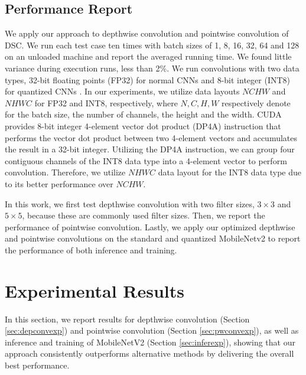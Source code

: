 \subsection{Performance Report}
We apply our approach to depthwise convolution and pointwise convolution of DSC.  We run each test case ten times with batch sizes of 1, 8,
16, 32, 64 and 128 on an unloaded machine and report the averaged running time. We found little variance during execution runs, less than
2\%. We run convolutions with two data types, 32-bit floating points (FP32) for normal CNNs and 8-bit integer (INT8) for quantized CNNs
\cite{nagel2019data}. In our experiments, we utilize data layouts $NCHW$ and $NHWC$ for FP32 and INT8, respectively, where $N, C, H, W$
respectively denote for the batch size, the number of channels, the height and the width. CUDA \cite{cudatoolkit} provides 8-bit integer
4-element vector dot product (DP4A) instruction that performs the vector dot product between two 4-element vectors and accumulates the
result in a 32-bit integer. Utilizing the DP4A instruction, we can group four contiguous channels of the INT8 data type into a 4-element
vector to perform convolution. Therefore, we utilize $NHWC$ data layout for the INT8 data type due to its better performance over $NCHW$.

In this work, we first test depthwise convolution with two filter sizes, $3 \times 3$ and $5 \times 5$, because these are commonly used
filter sizes. Then, we report the performance of pointwise convolution. Lastly, we apply our optimized depthwise and pointwise convolutions
on the standard and quantized MobileNetv2 to report the performance of both inference and training.
%

\section{Experimental Results}
\label{exp} In this section, we report results for depthwise convolution (Section \ref{sec:depconvexp}) and pointwise convolution (Section
\ref{sec:pwconvexp}), as well as inference and training of MobileNetV2 (Section \ref{sec:inferexp}), showing that our approach consistently
outperforms alternative methods by delivering the overall best performance.


